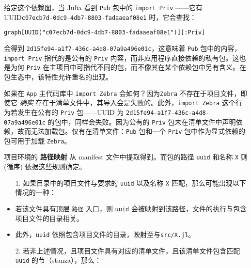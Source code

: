 给定这个依赖图，当 Julia 看到 \texttt{Pub} 包中的 \texttt{import Priv} ——它有 UUID\texttt{c07ecb7d-0dc9-4db7-8803-fadaaeaf08e1} 时，它会查找：




\begin{verbatim}
graph[UUID("c07ecb7d-0dc9-4db7-8803-fadaaeaf08e1")][:Priv]
\end{verbatim}



会得到 \texttt{2d15fe94-a1f7-436c-a4d8-07a9a496e01c}，这意味着 \texttt{Pub} 包中的内容，\texttt{import Priv} 指代的是公有的 \texttt{Priv} 内容，而非应用程序直接依赖的私有包。这也是为何 \texttt{Priv} 在主项目中可指代不同的包，而不像其在某个依赖包中另有含义。在包生态中，该特性允许重名的出现。



如果在 \texttt{App} 主代码库中 \texttt{import Zebra} 会如何？因为\texttt{Zebra} 不存在于项目文件，即使它 \emph{确实} 存在于清单文件中，其导入会是失败的。此外，\texttt{import Zebra} 这个行为若发生在公有的 \texttt{Priv} 包——UUID 为 \texttt{2d15fe94-a1f7-436c-a4d8-07a9a496e01c} 的包中，同样会失败。因为公有的 \texttt{Priv} 包未在清单文件中声明依赖，故而无法加载包。仅有在清单文件：\texttt{Pub} 包和一个 \texttt{Priv} 包中作为显式依赖的包可用于加载 \texttt{Zebra}。



项目环境的 \textbf{路径映射} 从 manifest 文件中提取得到。而包的路径 \texttt{uuid} 和名称 \texttt{X} 则 (循序) 依据这些规则确定。



\begin{itemize}
\item[1. ] 如果目录中的项目文件与要求的 \texttt{uuid} 以及名称 \texttt{X} 匹配，那么可能出现以下情况的一种：

\end{itemize}


\begin{itemize}
\item 若该文件具有顶层 \texttt{路径} 入口，则 \texttt{uuid} 会被映射到该路径，文件的执行与包含项目文件的目录相关。


\item 此外，\texttt{uuid} 依照包含项目文件的目录，映射至与\texttt{src/X.jl}。

\end{itemize}


\begin{itemize}
\item[2. ] 若非上述情况，且项目文件具有对应的清单文件，且该清单文件包含匹配 \texttt{uuid} 的节（stanza），那么：

\end{itemize}


